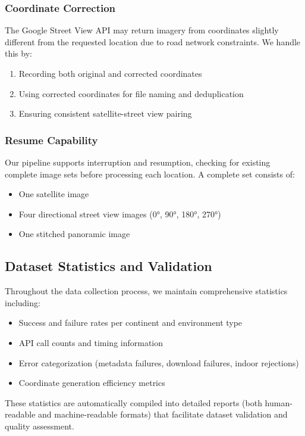 \subsubsection{Coordinate Correction}
The Google Street View API may return imagery from coordinates slightly different from the requested location due to road network constraints. We handle this by:
\begin{enumerate}
    \item Recording both original and corrected coordinates
    \item Using corrected coordinates for file naming and deduplication
    \item Ensuring consistent satellite-street view pairing
\end{enumerate}

\subsubsection{Resume Capability}
Our pipeline supports interruption and resumption, checking for existing complete image sets before processing each location. A complete set consists of:
\begin{itemize}
    \item One satellite image
    \item Four directional street view images (0°, 90°, 180°, 270°)
    \item One stitched panoramic image
\end{itemize}

\subsection{Dataset Statistics and Validation}

Throughout the data collection process, we maintain comprehensive statistics including:
\begin{itemize}
    \item Success and failure rates per continent and environment type
    \item API call counts and timing information
    \item Error categorization (metadata failures, download failures, indoor rejections)
    \item Coordinate generation efficiency metrics
\end{itemize}

These statistics are automatically compiled into detailed reports (both human-readable and machine-readable formats) that facilitate dataset validation and quality assessment.

